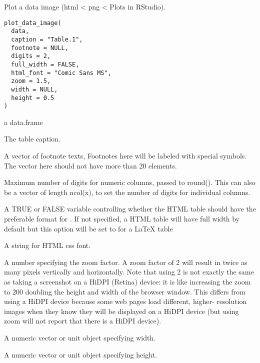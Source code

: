 \documentclass[letterpaper]{book}
\begin{document}
%
\begin{Description}
Plot a data image (html < png < Plots in RStudio).
\end{Description}
%
\begin{Usage}
\begin{verbatim}
plot_data_image(
  data,
  caption = "Table.1",
  footnote = NULL,
  digits = 2,
  full_width = FALSE,
  html_font = "Comic Sans MS",
  zoom = 1.5,
  width = NULL,
  height = 0.5
)
\end{verbatim}
\end{Usage}
%
\begin{Arguments}
\begin{ldescription}
\item[\code{data}] a data.frame

\item[\code{caption}] The table caption.

\item[\code{footnote}] A vector of footnote texts, Footnotes here will be labeled with special symbols.
The vector here should not have more than 20 elements.

\item[\code{digits}] Maximum number of digits for numeric columns, passed to round(). This can also be a vector of length ncol(x), to set the
number of digits for individual columns.

\item[\code{full\_width}] A TRUE or FALSE variable controlling whether the HTML table should have the preferable format for
. If not specified, a HTML table will have full width by default but this option will be set to  for a LaTeX table

\item[\code{html\_font}] A string for HTML css font.

\item[\code{zoom}] A number specifying the zoom factor. A zoom factor of 2 will result in twice as many pixels vertically and horizontally. Note that
using 2 is not exactly the same as taking a screenshot on a HiDPI (Retina) device: it is like increasing the zoom to 200 doubling the
height and width of the browser window. This differs from using a HiDPI device because some web pages load different, higher-
resolution images when they know they will be displayed on a HiDPI device (but using zoom will not report that there is a HiDPI
device).

\item[\code{width}] A numeric vector or unit object specifying width.

\item[\code{height}] A numeric vector or unit object specifying height.
\end{ldescription}
\end{Arguments}
\end{document}
